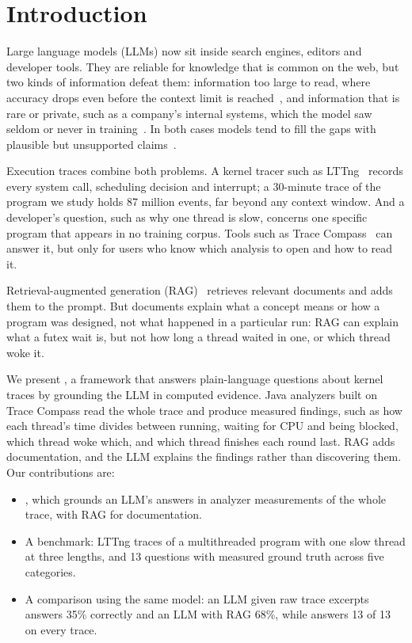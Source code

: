 \section{Introduction}

Large language models (LLMs) now sit inside search engines, editors and
developer tools. They are reliable for knowledge that is common on the web,
but two kinds of information defeat them: information too large to read,
where accuracy drops even before the context limit is
reached~\cite{liu2024lost}, and information that is rare or private, such
as a company's internal systems, which the model saw seldom or never in
training~\cite{kandpal2023longtail}. In both cases models tend to fill the
gaps with plausible but unsupported claims~\cite{ji2023hallucination}.

Execution traces combine both problems. A kernel tracer such as
LTTng~\cite{desnoyers2006lttng} records every system call, scheduling
decision and interrupt; a 30-minute trace of the program we study holds
87 million events, far beyond any context window. And a developer's
question, such as why one thread is slow, concerns one specific program
that appears in no training corpus. Tools such as Trace
Compass~\cite{tracecompass} can answer it, but only for users who know
which analysis to open and how to read it.

Retrieval-augmented generation (RAG)~\cite{lewis2020rag} retrieves
relevant documents and adds them to the prompt. But documents explain what
a concept means or how a program was designed, not what happened in a
particular run: RAG can explain what a futex wait is, but not how long a
thread waited in one, or which thread woke it.

We present \sysname, a framework that answers plain-language questions
about kernel traces by grounding the LLM in computed evidence. Java
analyzers built on Trace Compass read the whole trace and produce measured
findings, such as how each thread's time divides between running, waiting
for CPU and being blocked, which thread woke which, and which thread
finishes each round last. RAG adds documentation, and the LLM explains the
findings rather than discovering them. Our contributions are:
\begin{itemize}
  \item \sysname, which grounds an LLM's answers in analyzer measurements
        of the whole trace, with RAG for documentation.
  \item A benchmark: LTTng traces of a multithreaded program with one slow
        thread at three lengths, and 13 questions with measured ground
        truth across five categories.
  \item A comparison using the same model: an LLM given raw trace excerpts
        answers 35\% correctly and an LLM with RAG 68\%, while \sysname
        answers 13 of 13 on every trace.
\end{itemize}
